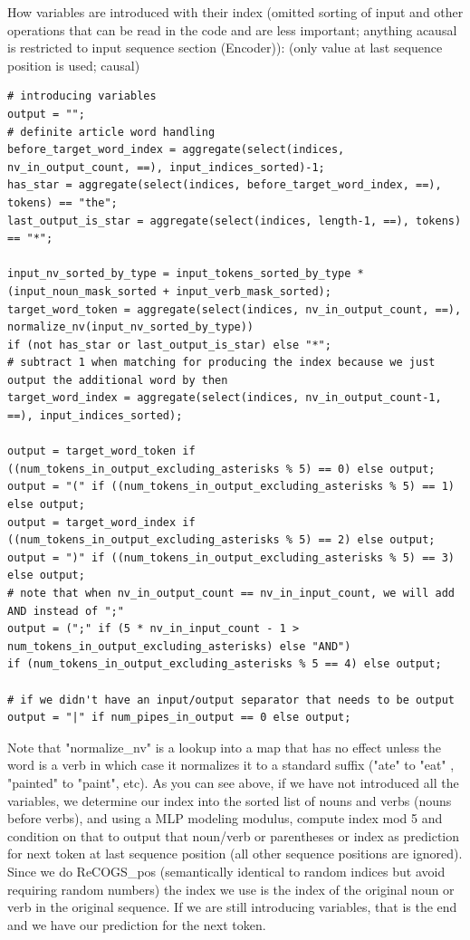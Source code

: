 \documentclass[11pt]{article}
\begin{document}
How variables are introduced with their index (omitted sorting of input and other operations that can be read in the code and are less important; anything acausal is restricted to input sequence section (Encoder)):
(only value at last sequence position is used; causal)
\begin{tiny}
\begin{verbatim}
# introducing variables
output = "";
# definite article word handling
before_target_word_index = aggregate(select(indices, nv_in_output_count, ==), input_indices_sorted)-1;
has_star = aggregate(select(indices, before_target_word_index, ==), tokens) == "the";
last_output_is_star = aggregate(select(indices, length-1, ==), tokens) == "*";

input_nv_sorted_by_type = input_tokens_sorted_by_type * (input_noun_mask_sorted + input_verb_mask_sorted);
target_word_token = aggregate(select(indices, nv_in_output_count, ==), normalize_nv(input_nv_sorted_by_type)) 
if (not has_star or last_output_is_star) else "*";
# subtract 1 when matching for producing the index because we just output the additional word by then
target_word_index = aggregate(select(indices, nv_in_output_count-1, ==), input_indices_sorted);

output = target_word_token if ((num_tokens_in_output_excluding_asterisks % 5) == 0) else output;
output = "(" if ((num_tokens_in_output_excluding_asterisks % 5) == 1) else output;
output = target_word_index if ((num_tokens_in_output_excluding_asterisks % 5) == 2) else output;
output = ")" if ((num_tokens_in_output_excluding_asterisks % 5) == 3) else output;
# note that when nv_in_output_count == nv_in_input_count, we will add AND instead of ";"
output = (";" if (5 * nv_in_input_count - 1 > num_tokens_in_output_excluding_asterisks) else "AND") 
if (num_tokens_in_output_excluding_asterisks % 5 == 4) else output;

# if we didn't have an input/output separator that needs to be output
output = "|" if num_pipes_in_output == 0 else output;
\end{verbatim}
\end{tiny}
Note that "normalize\_nv" is a lookup into a map that has no effect unless the word is a verb in which case it normalizes it to a standard suffix ("ate" to "eat" , "painted" to "paint", etc).
\clearpage
As you can see above, if we have not introduced all the variables, we determine our index into the sorted list of nouns and verbs (nouns before verbs), and using a MLP modeling modulus, compute index mod 5 and condition on that to output that noun/verb or parentheses or index as prediction for next token at last sequence position (all other sequence positions are ignored). Since we do ReCOGS\_pos (semantically identical to random indices but avoid requiring random numbers) the index we use is the index of the original noun or verb in the original sequence. If we are still introducing variables, that is the end and we have our prediction for the next token.
\end{document}
